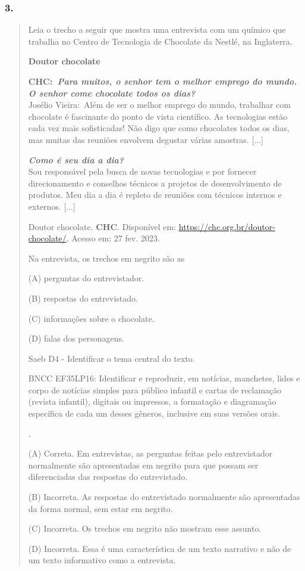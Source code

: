 \subsubsection{3. }\label{section-86}

\begin{quote}
Leia o trecho a seguir que mostra uma entrevista com um químico que
trabalha no Centro de Tecnologia de Chocolate da Nestlé, na Inglaterra.

\textbf{Doutor chocolate}

\textbf{CHC:\emph{~Para muitos, o senhor tem o melhor emprego do mundo.
O senhor come chocolate todos os dias?}}\\
Josélio Vieira:~Além de ser o melhor emprego do mundo, trabalhar com
chocolate é fascinante do ponto de vista científico. As tecnologias
estão cada vez mais sofisticadas! Não digo que como chocolates todos os
dias, mas muitas das reuniões envolvem degustar várias amostras.
{[}...{]}

\emph{\textbf{Como é seu dia a dia?}}\\
Sou responsável pela busca de novas tecnologias e por fornecer
direcionamento e conselhos técnicos a projetos de desenvolvimento de
produtos. Meu dia a dia é repleto de reuniões com técnicos internos e
externos. {[}...{]}

Doutor chocolate. \textbf{CHC}. Disponível em:
\url{https://chc.org.br/doutor-chocolate/}. Acesso em: 27 fev. 2023.

Na entrevista, os trechos em negrito são as

(A) perguntas do entrevistador.

(B) respostas do entrevistado.

(C) informações sobre o chocolate.

(D) falas dos personagens.

Saeb D4 - Identificar o tema central do texto.

BNCC EF35LP16: Identificar e reproduzir, em notícias, manchetes, lides e
corpo de notícias simples para público infantil e cartas de reclamação
(revista infantil), digitais ou impressos, a formatação e diagramação
específica de cada um desses gêneros, inclusive em suas versões orais.

.

(A) Correta. Em entrevistas, as perguntas feitas pelo entrevistador
normalmente são apresentadas em negrito para que possam ser
diferenciadas das respostas do entrevistado.

(B) Incorreta. As respostas do entrevistado normalmente são apresentadas
da forma normal, sem estar em negrito.

(C) Incorreta. Os trechos em negrito não mostram esse assunto.

(D) Incorreta. Essa é uma característica de um texto narrativo e não de
um texto informativo como a entrevista.
\end{quote}

